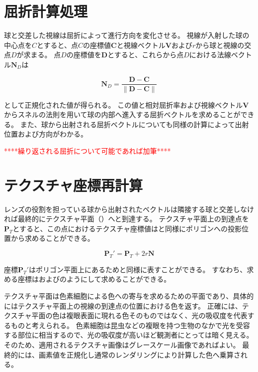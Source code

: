 \section{屈折計算処理}
\label{SRefraction}

球と交差した視線は屈折によって進行方向を変化させる。
視線が入射した球の中心点を$C$とすると、点$C$の座標値$\bm{C}$と視線ベクトル$\bm{V}$および$r$から球と視線の交点$D$が求まる\figref{}。
点$D$の座標値を$\bm{D}$とすると、これらから点$D$における法線ベクトル$\bm{N}_D$は

\begin{equation}
\label{ENd}
\bm{N}_D = \frac{\bm{D} - \bm{C}}{\|\bm{D} - \bm{C}\|}
\end{equation}

\noindent
として正規化された値が得られる。
この値と相対屈折率および視線ベクトル$\bm{V}$からスネルの法則を用いて球の内部へ進入する屈折ベクトルを求めることができる。
また、球から出射される屈折ベクトルについても同様の計算によって出射位置および方向がわかる。

\textcolor{red}{****繰り返される屈折について可能であれば加筆****}

\section{テクスチャ座標再計算}
\label{STexturerecalculation}

レンズの役割を担っている球から出射されたベクトルは隣接する球と交差しなければ最終的にテクスチャ平面（）へと到達する。
テクスチャ平面上の到達点を$\bm{P}_T$とすると、この点におけるテクスチャ座標値はと同様にポリゴンへの投影位置から求めることができる。

\begin{equation}
\label{EPtdash}
\bm{P}_T' = \bm{P}_T + 2r\bm{N}
\end{equation}

座標$\bm{P}_T'$はポリゴン平面上にあるためと同様に表すことができる。
すなわち、求める座標はおよびのようにして求めることができる。


テクスチャ平面は色素細胞による色への寄与を求めるための平面であり、具体的にはテクスチャ平面上の視線の到達点の位置における色を返す。
正確には、テクスチャ平面の色は複眼表面に現れる色そのものではなく、光の吸収度を代表するものと考えられる。
色素細胞は昆虫などの複眼を持つ生物のなかで光を受容する部位に相当するので、光の吸収度が高いほど観測者にとっては暗く見える。
そのため、適用されるテクスチャ画像はグレースケール画像であればよい。
最終的には、画素値を正規化し通常のレンダリングにより計算した色へ乗算される。



